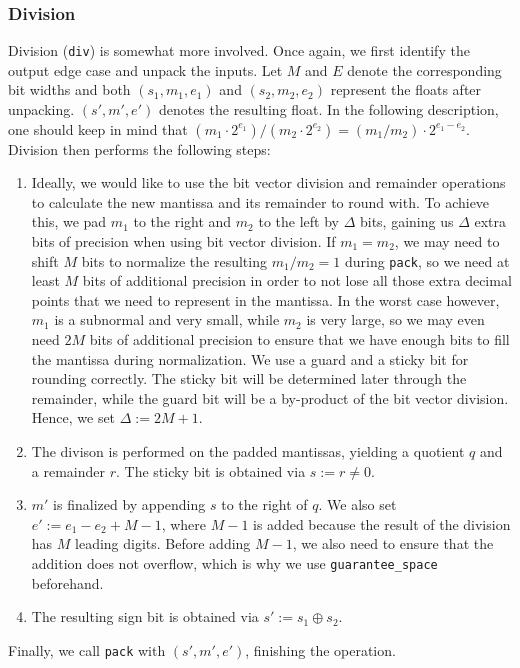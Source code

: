 \documentclass[a4paper,UKenglish,cleveref, autoref, thm-restate]{lipics-v2019}
\begin{document}
\subsubsection{Division}
Division (\verb|div|) is somewhat more involved. Once again, we first identify the output edge case and unpack the inputs. Let $M$ and $E$ denote the corresponding bit widths and both $(s_1, m_1, e_1)$ and $(s_2, m_2, e_2)$ represent the floats after unpacking. $(s', m', e')$ denotes the resulting float. In the following description, one should keep in mind that $(m_1 \cdot 2^{e_1}) / (m_2 \cdot 2^{e_2}) = (m_1 / m_2) \cdot 2^{e_1 - e_2}$.
Division then performs the following steps:
\begin{enumerate}
	\item Ideally, we would like to use the bit vector division and remainder operations to calculate the new mantissa and its remainder to round with. To achieve this, we pad $m_1$ to the right and $m_2$ to the left by $\Delta$ bits, gaining us $\Delta$ extra bits of precision when using bit vector division. If $m_1 = m_2$, we may need to shift $M$ bits to normalize the resulting $m_1 / m_2 = 1$ during \verb|pack|, so we need at least $M$ bits of additional precision in order to not lose all those extra decimal points that we need to represent in the mantissa. In the worst case however, $m_1$ is a subnormal and very small, while $m_2$ is very large, so we may even need $2M$ bits of additional precision to ensure that we have enough bits to fill the mantissa during normalization. We use a guard and a sticky bit for rounding correctly. The sticky bit will be determined later through the remainder, while the guard bit will be a by-product of the bit vector division. Hence, we set $\Delta := 2M + 1$.
	\item The divison is performed on the padded mantissas, yielding a quotient $q$ and a remainder $r$. The sticky bit is obtained via $s := r \neq 0$.
	\item $m'$ is finalized by appending $s$ to the right of $q$. We also set $e' := e_1 - e_2 + M - 1$, where $M - 1$ is added because the result of the division has $M$ leading digits. Before adding $M - 1$, we also need to ensure that the addition does not overflow, which is why we use \verb|guarantee_space| beforehand.
	\item The resulting sign bit is obtained via $s' := s_1 \oplus s_2$.
\end{enumerate}
Finally, we call \verb|pack| with $(s', m', e')$, finishing the operation.
\end{document}

